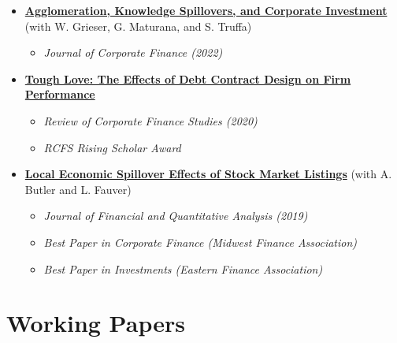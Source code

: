 \documentclass{article}[12]
\begin{document}
\begin{itemize}[itemsep=1.3em]
\item[$\bullet$] \href{https://papers.ssrn.com/sol3/papers.cfm?abstract_id=2851588}{\textbf{Agglomeration, Knowledge Spillovers, and Corporate Investment}} (with W. Grieser, G. Maturana, and S. Truffa)
\begin{itemize}
    \item[-] \textit{Journal of Corporate Finance (2022)}
\end{itemize}

\item[$\bullet$] \href{https://papers.ssrn.com/sol3/papers.cfm?abstract_id=2551333}{\textbf{Tough Love: The Effects of Debt Contract Design on Firm Performance}}
\begin{itemize}
    \item[-] \textit{Review of Corporate Finance Studies (2020)}
    \item[-] \textit{RCFS Rising Scholar Award}
\end{itemize}

\item[$\bullet$] \href{https://papers.ssrn.com/sol3/papers.cfm?abstract_id=2695464}{\textbf{Local Economic Spillover Effects of Stock Market Listings}} (with A. Butler and L. Fauver)
\begin{itemize}
    \item[-] \textit{Journal of Financial and Quantitative Analysis (2019)}
    \item[-] \textit{Best Paper in Corporate Finance (Midwest Finance Association)}
    \item[-] \textit{Best Paper in Investments (Eastern Finance Association)}
\end{itemize}
\end{itemize}


\section{Working Papers}
\end{document}
